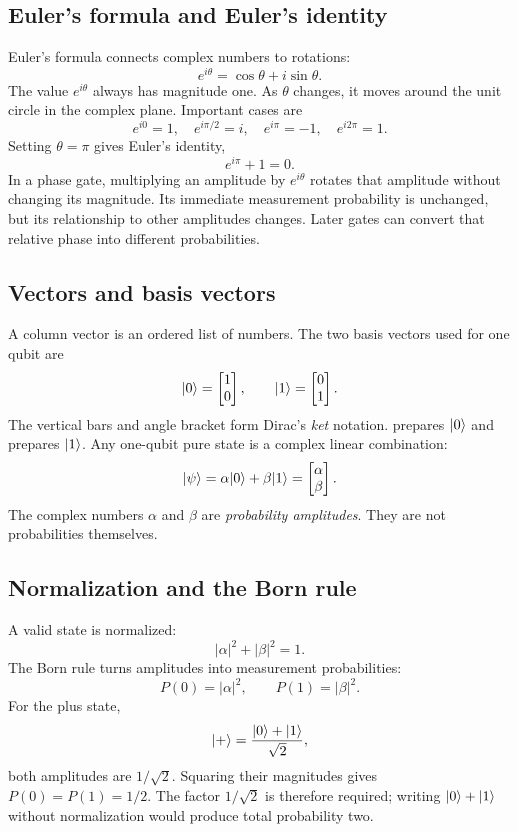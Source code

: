 \subsection{Euler's formula and Euler's identity}

Euler's formula connects complex numbers to rotations:
\[
e^{i\theta}=\cos\theta+i\sin\theta.
\]
The value $e^{i\theta}$ always has magnitude one. As $\theta$ changes, it moves
around the unit circle in the complex plane. Important cases are
\[
e^{i0}=1,\quad e^{i\pi/2}=i,\quad e^{i\pi}=-1,\quad
e^{i2\pi}=1.
\]
Setting $\theta=\pi$ gives Euler's identity,
\[
e^{i\pi}+1=0.
\]
In a phase gate, multiplying an amplitude by $e^{i\theta}$ rotates that
amplitude without changing its magnitude. Its immediate measurement
probability is unchanged, but its relationship to other amplitudes changes.
Later gates can convert that relative phase into different probabilities.

\subsection{Vectors and basis vectors}

A column vector is an ordered list of numbers. The two basis vectors used for
one qubit are
\[
\lvert 0\rangle=\begin{bmatrix}1\\0\end{bmatrix},\qquad
\lvert 1\rangle=\begin{bmatrix}0\\1\end{bmatrix}.
\]
The vertical bars and angle bracket form Dirac's \emph{ket} notation.
 prepares $\lvert 0\rangle$ and  prepares $\lvert 1\rangle$.
Any one-qubit pure state is a complex linear combination:
\[
\lvert \psi\rangle=\alpha\lvert 0\rangle+\beta\lvert 1\rangle
=\begin{bmatrix}\alpha\\\beta\end{bmatrix}.
\]
The complex numbers $\alpha$ and $\beta$ are \emph{probability amplitudes}.
They are not probabilities themselves.

\subsection{Normalization and the Born rule}

A valid state is normalized:
\[
|\alpha|^2+|\beta|^2=1.
\]
The Born rule turns amplitudes into measurement probabilities:
\[
P(0)=|\alpha|^2,\qquad P(1)=|\beta|^2.
\]
For the plus state,
\[
\lvert +\rangle=\frac{\lvert 0\rangle+\lvert 1\rangle}{\sqrt2},
\]
both amplitudes are $1/\sqrt2$. Squaring their magnitudes gives
$P(0)=P(1)=1/2$. The factor $1/\sqrt2$ is therefore required; writing
$\lvert 0\rangle+\lvert 1\rangle$ without normalization would produce total probability two.

